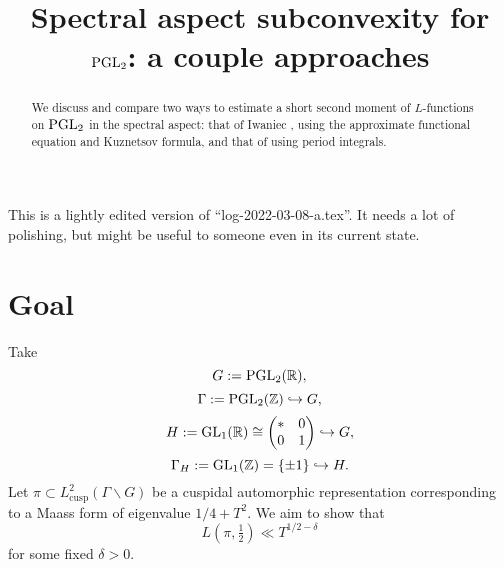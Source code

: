 \documentclass[reqno]{amsart} 
\title{Spectral aspect subconvexity for $\operatorname{PGL}_2$: a couple approaches}
\numberwithin{equation}{section}
\numberwithin{theorem}{section}
\begin{document}
\maketitle
\tableofcontents


\begin{abstract}
  We discuss and compare two ways to estimate a short second moment of $L$-functions on $\operatorname{PGL}_2$ in the spectral aspect: that of Iwaniec \cite{Iwaniec1992}, using the approximate functional equation and Kuznetsov formula, and that of \cite{2021arXiv210915230N} using period integrals.
\end{abstract}

\begin{remark}
  This is a lightly edited version of ``log-2022-03-08-a.tex''.  It needs a lot of polishing, but might be useful to someone even in its current state.
\end{remark}

\section{Goal}\label{sec:org64b74bb}
Take
\begin{equation*}
G := \operatorname{PGL}_2(\mathbb{R}),
\end{equation*}
\begin{equation*}
\Gamma := \operatorname{PGL}_2(\mathbb{Z}) \hookrightarrow G,
\end{equation*}
\begin{equation*}
  H := \operatorname{GL}_1(\mathbb{R}) \cong  \begin{pmatrix} \ast & 0 \\ 0 & 1 \end{pmatrix} \hookrightarrow G,
\end{equation*}
\begin{equation*}
\Gamma_H := \operatorname{GL}_1(\mathbb{Z}) = \{\pm 1\} \hookrightarrow  H.
\end{equation*}
Let $\pi \subset L^2_{\text{cusp}}(\Gamma \backslash G)$ be a cuspidal automorphic representation corresponding to a Maass form of eigenvalue $1/4 + T^2$.  We aim to show that
\begin{equation}\label{eqn:35ac318817}
  L(\pi,\tfrac{1}{2}) \ll T^{1/2 - \delta}
\end{equation}
for some fixed $\delta > 0$.
\end{document}
